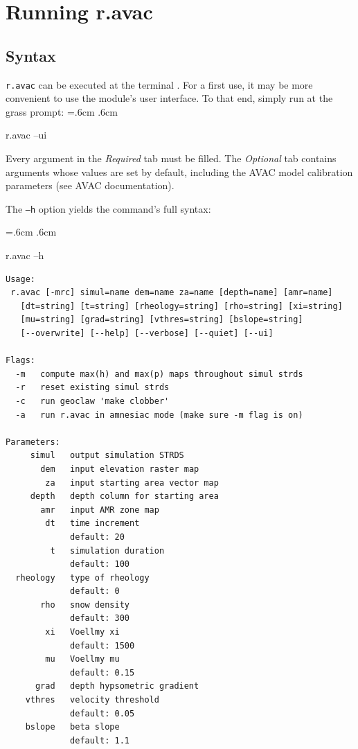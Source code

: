 \documentclass[12pt,oneside]{paper}
\newenvironment{code}{%
\vspace{2mm}%
\hangindent=.6cm%
\parindent.6cm%
\ttfamily%
\color{gris.3}%
}{
\vspace{2mm}%
}
\begin{document}
\section{Running r.avac}

\subsection{Syntax}

\verb+r.avac+ can be executed at the terminal . For a first use, it may be more convenient to use the module's user interface. To that end, simply run at the grass prompt:
\begin{code}
r.avac --ui
\end{code}

Every argument in the \emph{Required} tab must be filled. The \emph{Optional} tab contains arguments whose values are set by default, including the AVAC model calibration parameters (see AVAC documentation).


The \texttt{--h} option yields the command's full syntax:

\begin{code}
r.avac --h
\begin{Verbatim}
Usage:
 r.avac [-mrc] simul=name dem=name za=name [depth=name] [amr=name]
   [dt=string] [t=string] [rheology=string] [rho=string] [xi=string]
   [mu=string] [grad=string] [vthres=string] [bslope=string]
   [--overwrite] [--help] [--verbose] [--quiet] [--ui]

Flags:
  -m   compute max(h) and max(p) maps throughout simul strds
  -r   reset existing simul strds
  -c   run geoclaw 'make clobber'
  -a   run r.avac in amnesiac mode (make sure -m flag is on)

Parameters:
     simul   output simulation STRDS
       dem   input elevation raster map
        za   input starting area vector map
     depth   depth column for starting area
       amr   input AMR zone map
        dt   time increment
             default: 20
         t   simulation duration
             default: 100
  rheology   type of rheology
             default: 0
       rho   snow density
             default: 300
        xi   Voellmy xi
             default: 1500
        mu   Voellmy mu
             default: 0.15
      grad   depth hypsometric gradient
    vthres   velocity threshold
             default: 0.05
    bslope   beta slope
             default: 1.1
\end{Verbatim}
\end{code}
\end{document}
